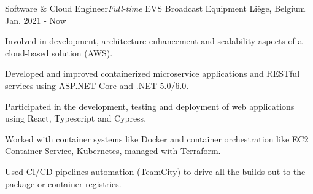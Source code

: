 
\begin{cventries}

  \cventry
    {Software \& Cloud Engineer{\enskip\cdotp\enskip}\it{Full-time}} %
    {EVS Broadcast Equipment} %
    {Liège, Belgium} %
    {Jan. 2021 - Now} %
    {
      \begin{cvitems} %
        \item{Involved in development, architecture enhancement and scalability aspects of a cloud-based solution (AWS).}
        \item{Developed and improved containerized microservice applications and RESTful services using ASP.NET Core and .NET 5.0/6.0.}
        \item{Participated in the development, testing and deployment of web applications using React, Typescript and Cypress.}
        \item{Worked with container systems like Docker and container orchestration like EC2 Container Service, Kubernetes, managed with Terraform.}
        \item{Used CI/CD pipelines automation (TeamCity) to drive all the builds out to the package or container registries.}
      \end{cvitems}
    }


\end{cventries}
